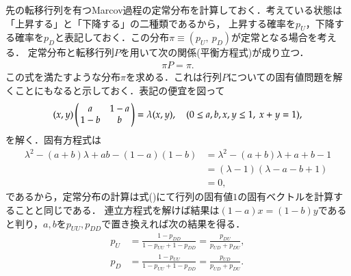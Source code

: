 \documentclass[a4j,papersize,disablejfam,slide,14pt]{jsarticle}
\begin{document}
    先の転移行列を有つ{\rm Marcov}過程の定常分布を計算しておく．考えている状態は「上昇する」と「下降する」の二種類であるから，
    上昇する確率を$p_U$，下降する確率を$p_D$と表記しておく．この分布$\pi \equiv (p_U,\ p_D)$が定常となる場合を考える．
    定常分布と転移行列$P$を用いて次の関係(平衡方程式)が成り立つ．
    \begin{align}
    	\pi P = \pi.
    \end{align}
    この式を満たすような分布$\pi$を求める．これは行列$P$についての固有値問題を解くことにもなると示しておく．表記の便宜を図って
    \begin{align}
    	(x,y) \left(
    	\begin{array}{@{\,}cc@{\,}}
    		a & 1-a \\
            1-b & b
    	\end{array}
    	\right)
        = \lambda(x,y), \quad (0 \leq a, b, x, y \leq 1,\ x+y=1), \label{eq:balance_equation}
    \end{align}
    を解く．固有方程式は
    \begin{align}
    	\lambda^2 - (a + b)\lambda + ab - (1-a)(1-b)
        &= \lambda^2 - (a + b)\lambda + a + b - 1 \\
        &= (\lambda - 1)(\lambda - a - b + 1) \\
        &= 0,
    \end{align}
    であるから，定常分布の計算は式()にて行列の固有値$1$の固有ベクトルを計算することと同じである．
    連立方程式を解けば結果は$(1-a)x=(1-b)y$であると判り，$a,b$を$p_{UU}, p_{DD}$で置き換えれば次の結果を得る．
    \begin{align}
    	p_U &= \frac{1-p_{DD}}{1 - p_{UU} + 1 - p_{DD}} = \frac{p_{DU}}{p_{UD}+p_{DU}}, \\
        p_D &= \frac{1-p_{UU}}{1 - p_{UU} + 1 - p_{DD}} = \frac{p_{UD}}{p_{UD}+p_{DU}}. \label{eq:stationary_dist}
    \end{align}
    
\end{document}
